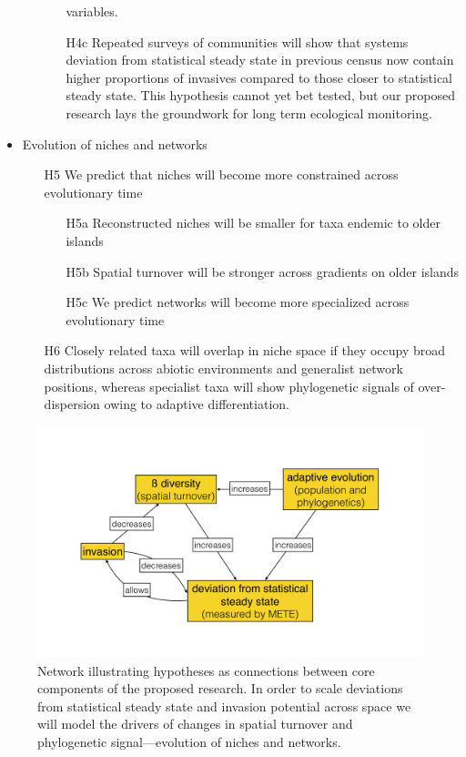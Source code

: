 \documentclass[11pt]{article}
\begin{document}
\begin{itemize}
\begin{itemize}
\begin{itemize}
      variables.
    \item[H4c] Repeated surveys of communities will show that systems
      deviation from statistical steady state in previous census now
      contain higher proportions of invasives compared to those closer
      to statistical steady state.  This hypothesis cannot yet bet
      tested, but our proposed research lays the groundwork for long
      term ecological monitoring.
    \end{itemize}
  \end{itemize}
\item Evolution of niches and networks
  \begin{itemize}
  \item[H5] We predict that niches will become more constrained
    across evolutionary time
    \begin{itemize}
    \item[H5a] Reconstructed niches will be smaller for taxa endemic to older islands
    \item[H5b] Spatial turnover will be stronger across gradients on older islands
    \item[H5c] We predict networks will become more specialized
      across evolutionary time
    \end{itemize}
  \item[H6] Closely related taxa will overlap in niche space if they
    occupy broad distributions across abiotic environments and
    generalist network positions, whereas specialist taxa will show
    phylogenetic signals of over-dispersion owing to adaptive
    differentiation.
  \end{itemize}
\end{itemize}


\begin{figure}[!htb]
  \centering
  \includegraphics[scale=0.3]{../figs/fig_concept.pdf}
  \caption{Network illustrating hypotheses as connections between core
    components of the proposed research. In order to scale deviations
    from statistical steady state and invasion potential across space
    we will model the drivers of changes in spatial turnover and
    phylogenetic signal---evolution of niches and networks.}
  \label{fig:concept}
\end{figure}
\end{document}
